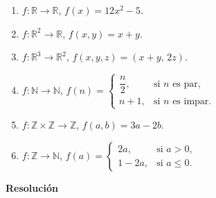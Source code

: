 \documentclass[11pt]{article}
\begin{document}
\begin{enumerate}[label=\roman*)]
    \item $f:\mathbb{R}\to\mathbb{R}$, \quad $f(x)=12x^{2}-5$.
    \item $f:\mathbb{R}^{2}\to\mathbb{R}$, \quad $f(x,y)=x+y$.
    \item $f:\mathbb{R}^{3}\to\mathbb{R}^{2}$, \quad $f(x,y,z)=(x+y,\,2z)$.
    \item $f:\mathbb{N}\to\mathbb{N}$, \quad
    $f(n)=
        \begin{cases}
            \dfrac{n}{2}, & \text{si $n$ es par},\\[6pt]
            n+1, & \text{si $n$ es impar}.
        \end{cases}$
    \item $f:\mathbb{Z}\times\mathbb{Z}\to\mathbb{Z}$, \quad $f(a,b)=3a-2b$.
    \item $f:\mathbb{Z}\to\mathbb{N}$, \quad
    $f(a)=
        \begin{cases}
            2a, & \text{si } a>0,\\[4pt]
            1-2a, & \text{si } a\le 0.
        \end{cases}$
\end{enumerate}
\textbf{Resolución}
\end{document}
